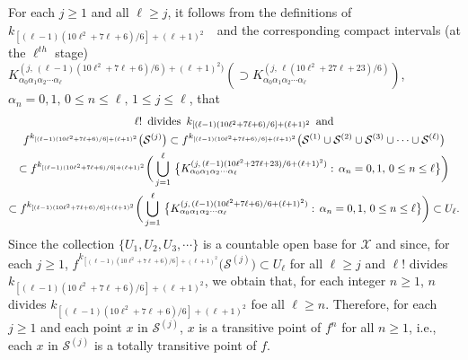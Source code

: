 \documentclass[12pt]{article}
\newcommand{\al}{\alpha}
\begin{document}
For each $j \ge 1$ and all $\ell \ge j$, it follows from the definitions of \,\, $k_{[(\ell-1)(10\ell^2+7\ell+6)/6]+(\ell+1)^2}$ \,\, and the corresponding compact intervals (at the $\ell^{th}$ stage) $K_{\al_0\al_1\al_2\cdots\al_\ell}^{(j, \, (\ell-1)(10\ell^2+7\ell+6)/6)+(\ell+1)^2)} (\supset K_{\al_0\al_1\al_2\cdots\al_\ell}^{(j, \, \ell(10\ell^2+27\ell+23)/6)})$, $\al_n = 0, 1, \, 0 \le n \le \ell, \, 1 \le j \le \ell$, that
\begin{multline*}
$$
{\ell}! \,\,\, \text{divides} \,\,\, k_{[(\ell-1)(10\ell^2+7\ell+6)/6]+(\ell+1)^2} \,\,\, \text{and} \\ 
f^{k_{[(\ell-1)(10\ell^2+7\ell+6)/6]+(\ell+1)^2}}\big(\mathcal S^{(j)}\big) \subset f^{k_{[(\ell-1)(10\ell^2+7\ell+6)/6]+(\ell+1)^2}}\big(\mathcal S^{(1)} \cup \mathcal S^{(2)} \cup \mathcal S^{(3)} \cup \cdots \cup \mathcal S^{(\ell)} \big) \\
\subset f^{k_{[(\ell-1)(10\ell^2+7\ell+6)/6]+(\ell+1)^2}}\bigg(\bigcup_{j=1}^\ell \, \big\{ K_{\al_0\al_1\al_2\cdots\al_\ell}^{(j, \, (\ell-1)(10\ell^2+27\ell+23)/6+(\ell+1)^2)}: \, \al_n = 0, 1, \, 0 \le n \le \ell \big\}\bigg) \\
\subset f^{k_{[(\ell-1)(10\ell^2+7\ell+6)/6]+(\ell+1)^2}}\bigg(\bigcup_{j=1}^\ell \, \big\{ K_{\al_0\al_1\al_2\cdots\al_\ell}^{(j, \, (\ell-1)(10\ell^2+7\ell+6)/6+(\ell+1)^2)}: \, \al_n = 0, 1, \, 0 \le n \le \ell \big\}\bigg) \subset U_\ell.
$$  
\end{multline*}
\indent Since the collection $\{ U_1, U_2, U_3, \cdots \}$ is a countable open base for $\mathcal X$ and since, for each $j \ge 1$, $f^{k_{[(\ell-1)(10\ell^2+7\ell+6)/6]+(\ell+1)^2}}\big(\mathcal S^{(j)}\big) \subset U_\ell$ for all $\ell \ge j$ and ${\ell}!$ divides $k_{[(\ell-1)(10\ell^2+7\ell+6)/6]+(\ell+1)^2}$, we obtain that, for each integer $n \ge 1$, $n$ divides $k_{[(\ell-1)(10\ell^2+7\ell+6)/6]+(\ell+1)^2}$ foe all $\ell \ge n$.  Therefore, for each $j \ge 1$ and each point $x$ in $\mathcal S^{(j)}$, $x$ is a transitive point of $f^n$ for all $n \ge 1$, i.e., each $x$ in $\mathcal S^{(j)}$ is a totally transitive point of $f$.  
\end{document}
